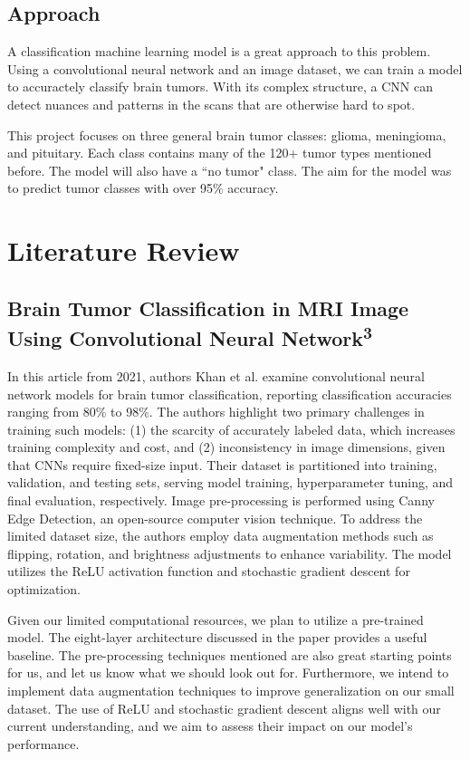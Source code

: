 \documentclass[conference]{IEEEtran}
\begin{document}
\subsection{\large Approach}

A classification machine learning model is a great approach to this problem. Using a convolutional neural network and an image dataset, we can train a model to accuractely classify brain tumors. With its complex structure, a CNN can detect nuances and patterns in the scans that are otherwise hard to spot. 

This project focuses on three general brain tumor classes: glioma, meningioma, and pituitary. Each class contains many of the 120+ tumor types mentioned before. The model will also have a ``no tumor" class. The aim for the model was to predict tumor classes with over 95\% accuracy.

\section{\large Literature Review}

\subsection{\large Brain Tumor Classification in MRI Image Using Convolutional Neural Network\textsuperscript{3}}

In this article from 2021, authors Khan et al. examine convolutional neural network models for brain tumor classification, reporting classification accuracies ranging from 80\% to 98\%. The authors highlight two primary challenges in training such models: (1) the scarcity of accurately labeled data, which increases training complexity and cost, and (2) inconsistency in image dimensions, given that CNNs require fixed-size input. Their dataset is partitioned into training, validation, and testing sets, serving model training, hyperparameter tuning, and final evaluation, respectively. Image pre-processing is performed using Canny Edge Detection, an open-source computer vision technique. To address the limited dataset size, the authors employ data augmentation methods such as flipping, rotation, and brightness adjustments to enhance variability. The model utilizes the ReLU activation function and stochastic gradient descent for optimization.

Given our limited computational resources, we plan to utilize a pre-trained model. The eight-layer architecture discussed in the paper provides a useful baseline. The pre-processing techniques mentioned are also great starting points for us, and let us know what we should look out for. Furthermore, we intend to implement data augmentation techniques to improve generalization on our small dataset. The use of ReLU and stochastic gradient descent aligns well with our current understanding, and we aim to assess their impact on our model's performance.
\end{document}
